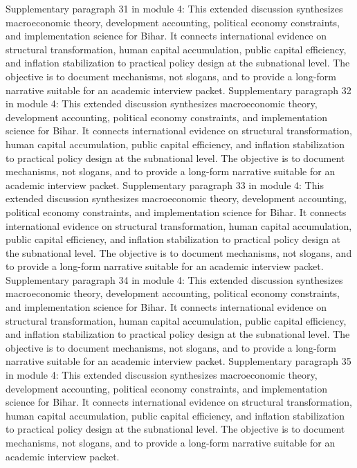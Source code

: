 \documentclass[preprint,12pt]{elsarticle}
\begin{document}
Supplementary paragraph 31 in module 4: This extended discussion synthesizes macroeconomic theory, development accounting, political economy constraints, and implementation science for Bihar. It connects international evidence on structural transformation, human capital accumulation, public capital efficiency, and inflation stabilization to practical policy design at the subnational level. The objective is to document mechanisms, not slogans, and to provide a long-form narrative suitable for an academic interview packet.
Supplementary paragraph 32 in module 4: This extended discussion synthesizes macroeconomic theory, development accounting, political economy constraints, and implementation science for Bihar. It connects international evidence on structural transformation, human capital accumulation, public capital efficiency, and inflation stabilization to practical policy design at the subnational level. The objective is to document mechanisms, not slogans, and to provide a long-form narrative suitable for an academic interview packet.
Supplementary paragraph 33 in module 4: This extended discussion synthesizes macroeconomic theory, development accounting, political economy constraints, and implementation science for Bihar. It connects international evidence on structural transformation, human capital accumulation, public capital efficiency, and inflation stabilization to practical policy design at the subnational level. The objective is to document mechanisms, not slogans, and to provide a long-form narrative suitable for an academic interview packet.
Supplementary paragraph 34 in module 4: This extended discussion synthesizes macroeconomic theory, development accounting, political economy constraints, and implementation science for Bihar. It connects international evidence on structural transformation, human capital accumulation, public capital efficiency, and inflation stabilization to practical policy design at the subnational level. The objective is to document mechanisms, not slogans, and to provide a long-form narrative suitable for an academic interview packet.
Supplementary paragraph 35 in module 4: This extended discussion synthesizes macroeconomic theory, development accounting, political economy constraints, and implementation science for Bihar. It connects international evidence on structural transformation, human capital accumulation, public capital efficiency, and inflation stabilization to practical policy design at the subnational level. The objective is to document mechanisms, not slogans, and to provide a long-form narrative suitable for an academic interview packet.
\end{document}
